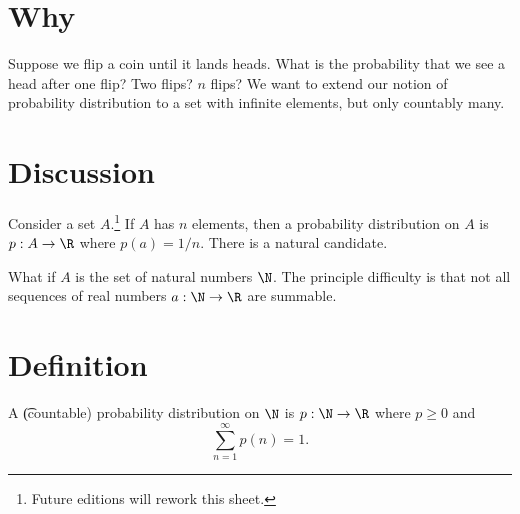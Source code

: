 
\section*{Why}

Suppose we flip a coin until it lands heads.
What is the probability that we see a head after one flip?
Two flips?
$n$ flips?
We want to extend our notion of probability distribution to a set with infinite elements, but only countably many.

\section*{Discussion}

Consider a set $A$.\footnote{Future editions will rework this sheet.}
If $A$ has $n$ elements, then a probability distribution on $A$ is $p: A \to \R $ where $p(a) = 1/n$.
There is a natural candidate.

What if $A$ is the set of natural numbers $\N  $.
The principle difficulty is that not all sequences
of real numbers $a: \N   \to \R $ are summable.

\section*{Definition}

A \t{(countable) probability distribution} on $\N  $ is $p: \N \to \R $ where $p \geq 0$ and
\[
\textstyle
\sum_{n =1}^{\infty} p(n) = 1.
\]

\blankpage